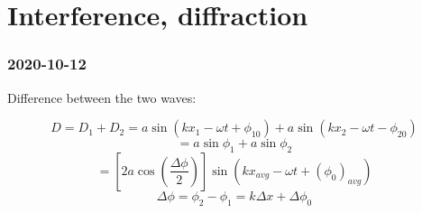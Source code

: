 \chapter{Interference, diffraction}

\subsection{2020-10-12}

Difference between the two waves:

$$D = D_1 + D_2 = a\sin(kx_1 - \omega t + \phi_{10}) + a\sin(kx_2 - \omega t - \phi_{20})$$
$$= a\sin \phi_1 + a\sin \phi_2$$
$$= \left[2a\cos\left(\frac{\Delta \phi}{2}\right)\right] \sin (kx_{avg} - \omega t + (\phi_0)_{avg})$$
$$\Delta \phi = \phi_2 - \phi_1 = k\Delta x + \Delta \phi_0$$